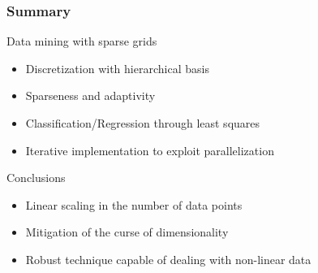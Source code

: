 \begin{frame}
  \frametitle{Summary}
  \topline
  \vspace{-10px}
  \begin{block}{Data mining with sparse grids}
    \begin{itemize}
    \item Discretization with hierarchical basis
    \item Sparseness and adaptivity
    \item Classification/Regression through least squares
    \item Iterative implementation to exploit parallelization
    \end{itemize}
  \end{block}
  \begin{block}{Conclusions}
    \begin{itemize}
    \item Linear scaling in the number of data points
    \item Mitigation of the curse of dimensionality
    \item Robust technique capable of dealing with non-linear data
    \end{itemize}
  \end{block}
\end{frame}


